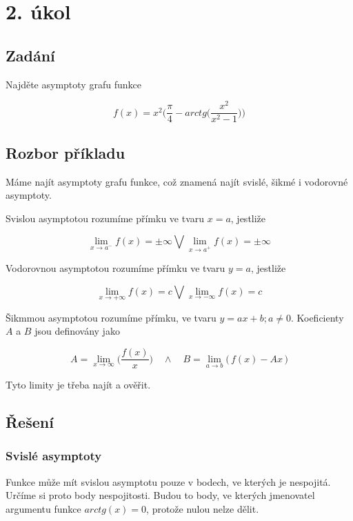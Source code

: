 \section{2. úkol}
\subsection{Zadání}

Najděte asymptoty grafu funkce 

\begin{displaymath}
f(x) = x^2\Big(\frac{\pi}{4}-arctg\Big(\frac{x^2}{x^2-1}\Big)\Big)
\end{displaymath}

\subsection{Rozbor příkladu}

Máme najít asymptoty grafu funkce, což znamená najít svislé, šikmé i vodorovné asymptoty.

Svislou asymptotou rozumíme přímku ve tvaru $x=a$, jestliže 

\begin{displaymath}
\lim_{x \to a^-} f(x) = \pm \infty \bigvee\lim_{x \to a^+} f(x) = \pm \infty
\end{displaymath}

Vodorovnou asymptotou rozumíme přímku ve tvaru $y=a$, jestliže

\begin{displaymath}
\lim_{x \to +\infty} f(x) = c \bigvee\lim_{x \to - \infty} f(x) = c
\end{displaymath}

Šikmmou asymptotou rozumíme přímku, ve tvaru $y=ax+b;a \neq 0$. Koeficienty $A$ a $B$ jsou definovány jako

\begin{displaymath}
A = \lim_{x \rightarrow \infty}\Big( \frac{f(x)}{x}\Big) \quad\wedge\quad B = \lim_{a \rightarrow b}\big(\,f(x)-Ax\,\big)
\end{displaymath}

Tyto limity je třeba najít a ověřit.

\subsection{Řešení}

\subsubsection{Svislé asymptoty}
Funkce může mít svislou asymptotu pouze v bodech, ve kterých je nespojitá. Určíme si proto body nespojitosti. Budou to body, ve kterých jmenovatel argumentu funkce $arctg(x) = 0$, protože nulou nelze dělit.

